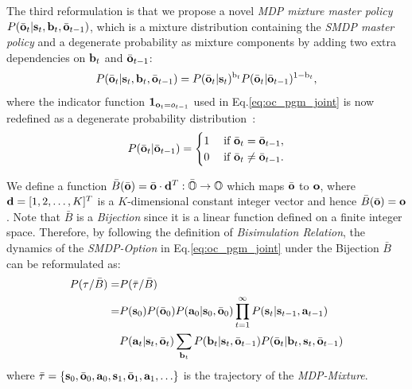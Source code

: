\documentclass[10pt,journal,compsoc]{IEEEtran}
\renewcommand{\cite}{\citep}
\begin{document}
The third reformulation is that we propose a novel \emph{MDP
  mixture master policy}
$P(\bar{{\mathbf{o}}}_t|{\mathbf{s}}_t,{\mathbf{b}}_t,\bar{{\mathbf{o}}}_{t-1})$, which is a
mixture distribution containing the \emph{SMDP master policy} and
a degenerate probability as mixture components by adding two
extra dependencies on ${\mathbf{b}}_t$ and $\bar{{\mathbf{o}}}_{t-1}$:
\begin{equation}
  \label{eq:mdp_oc_po}
P(\bar{\rvo}_t|\rvs_t,\rvb_t,\bar{\rvo}_{t-1}) = P(\bar{\rvo}_t|\rvs_t)^{\rb_t}P(\bar{\rvo}_t|\bar{\rvo}_{t-1})^{1-\rb_t},
\end{equation}
where the indicator function $\bm{1}_{{\mathbf{o}}_t=o_{t-1}}$ used in
Eq.\ref{eq:oc_pgm_joint} is now redefined as a degenerate
probability distribution~\cite{puterman2014markov}:
\begin{equation*}
  \label{eq:deg_puterman}
P(\bar{\rvo}_t|\bar{\rvo}_{t-1}) = 
\begin{cases}
  1&\;\text{if } \bar{\rvo}_t=\bar{\rvo}_{t-1},\\
  0&\;\text{if } \bar{\rvo}_t\neq\bar{\rvo}_{t-1}.
\end{cases}
\end{equation*}

We define a function
$\bar{B}(\bar{{\mathbf{o}}})=\bar{{\mathbf{o}}}\cdot{\mathbf{d}}^T:\bar{{\mathbb{O}}}\rightarrow{\mathbb{O}}$
which maps $\bar{{\mathbf{o}}}$ to ${\mathbf{o}}$, where ${\mathbf{d}}=[1,2,\dots,K]^T$
is a $K$-dimensional constant integer vector and hence
$\bar{B}(\bar{{\mathbf{o}}})={\mathbf{o}}$. Note that $\bar{B}$ is a
\emph{Bijection} since it is a linear function defined on a
finite integer space. Therefore, by following the definition of
\emph{Bisimulation Relation}, the dynamics of the \emph{SMDP-Option} in
Eq.\ref{eq:oc_pgm_joint} under the Bijection $\bar{B}$ can be
reformulated as:
\begin{align}
  \label{eq:mdp_pgm_joint}
  P(\tau/\bar{B}) =& P(\bar{\tau}/\bar{B})\nonumber\\
                     = &P(\rvs_0)P(\bar{\rvo}_0)P(\rva_0|\rvs_0,\bar{\rvo}_0)\prod_{t=1}^\infty P(\rvs_t|\rvs_{t-1},\rva_{t-1})\nonumber\\
                                            &P(\rva_{t}|\rvs_{t},\bar{\rvo}_{t})\sum_{\rvb_t}P(\rvb_t|\rvs_t,\bar{\rvo}_{t-1})P(\bar{\rvo}_t|\rvb_t,\rvs_t,\bar{\rvo}_{t-1})
\end{align}
where
$\bar{\tau}=\{{\mathbf{s}}_0,\bar{{\mathbf{o}}}_0,{\mathbf{a}}_0,{\mathbf{s}}_1,\bar{{\mathbf{o}}}_1,{\mathbf{a}}_1,\ldots\}$
is the trajectory of the \emph{MDP-Mixture}.
\end{document}
